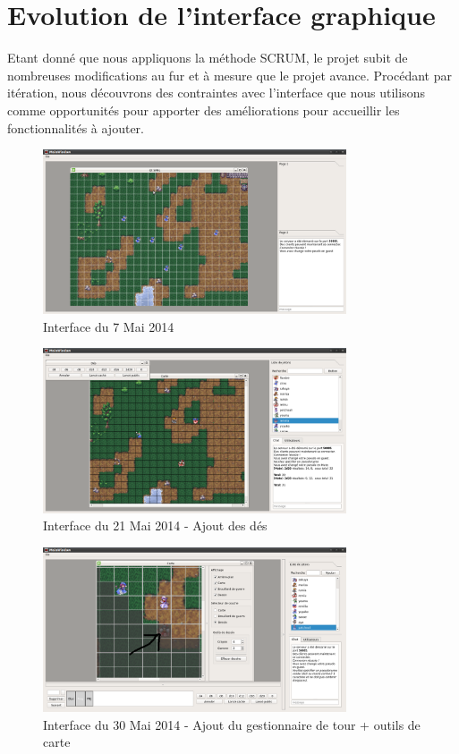 \section{Evolution de l'interface graphique}

Etant donné que nous appliquons la méthode SCRUM, le projet subit de nombreuses modifications au fur et à mesure que le projet avance. Procédant par itération, nous découvrons des contraintes avec l'interface que nous utilisons comme opportunités pour apporter des améliorations pour accueillir les fonctionnalités à ajouter. 

\begin{figure}[h!]
	\centering
	\includegraphics[width=0.8\textwidth]{img/gui_history/2014_05_07_screen.png}
	\caption{Interface du 7 Mai 2014}
\end{figure}

\begin{figure}[h!]
	\centering
	\includegraphics[width=0.8\textwidth]{img/gui_history/2014_05_21_screen.png}
	\caption{Interface du 21 Mai 2014 - Ajout des dés}
\end{figure}

\begin{figure}[h!]
	\centering
	\includegraphics[width=0.8\textwidth]{img/gui_history/2014_05_30_screen.png}
	\caption{Interface du 30 Mai 2014 - Ajout du gestionnaire de tour + outils de carte}
\end{figure}

